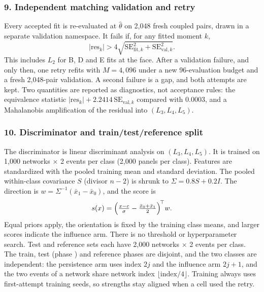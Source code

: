 \subsubsection*{9. Independent matching validation and retry}
Every accepted fit is re-evaluated at $\hat\theta$ on 2,048 fresh coupled pairs, drawn in a separate validation namespace. It fails if, for any fitted moment $k$,
\begin{equation*}
|\mathrm{res}_k|>4\sqrt{\mathrm{SE}_{\mathrm{fit},k}^2+\mathrm{SE}_{\mathrm{val},k}^2}.
\end{equation*}
This includes $L_2$ for B, D and E fits at the face. After a validation failure, and only then, one retry refits with $M=4{,}096$ under a new 96-evaluation budget and a fresh 2,048-pair validation. A second failure is a gap, and both attempts are kept. Two quantities are reported as diagnostics, not acceptance rules: the equivalence statistic $|\mathrm{res}_k|+2.2414\,\mathrm{SE}_{\mathrm{val},k}$ compared with 0.0003, and a Mahalanobis amplification of the residual into $(L_3,L_4,L_5)$.

\subsubsection*{10. Discriminator and train/test/reference split}
The discriminator is linear discriminant analysis on $(L_3,L_4,L_5)$. It is trained on 1,000 networks $\times$ 2 events per class (2,000 panels per class). Features are standardized with the pooled training mean and standard deviation. The pooled within-class covariance $S$ (divisor $n-2$) is shrunk to $\Sigma=0.8S+0.2I$. The direction is $w=\Sigma^{-1}(\bar x_1-\bar x_0)$, and the score is
\begin{equation*}
s(x)=\Bigl(\tfrac{x-c}{\sigma}-\tfrac{\bar x_0+\bar x_1}2\Bigr)^{\!\top} w.
\end{equation*}
Equal priors apply, the orientation is fixed by the training class means, and larger scores indicate the influence arm. There is no threshold or hyperparameter search. Test and reference sets each have 2,000 networks $\times$ 2 events per class. The train, test (phase ) and reference phases are disjoint, and the two classes are independent: the persistence arm uses index $2j$ and the influence arm $2j+1$, and the two events of a network share network index $\lfloor\text{index}/4\rfloor$. Training always uses first-attempt training seeds, so strengths stay aligned when a cell used the retry.

